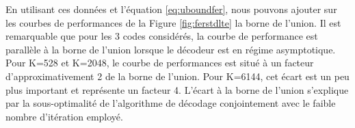 \begin{table}[]
\centering
\caption{Spectre de distance pour trois turbo codes du standard LTE}
\label{tab:spectre}
\end{table}
En utilisant ces données et l'équation \ref{eq:uboundfer}, nous pouvons ajouter sur les courbes de performances de la Figure \ref{fig:ferstdlte} la borne de l'union. Il est remarquable que pour les 3 codes considérés, la courbe de 
performance est parallèle à la borne de l'union lorsque le décodeur est en régime asymptotique. Pour K=528 et K=2048, 
le courbe de performances est situé à un facteur d'approximativement 2 de la borne de l'union. Pour K=6144, cet écart 
est un peu plus important et représente un facteur 4. L'écart à la borne de l'union s'explique par la sous-optimalité de l'algorithme de décodage conjointement avec le faible nombre d'itération employé.



